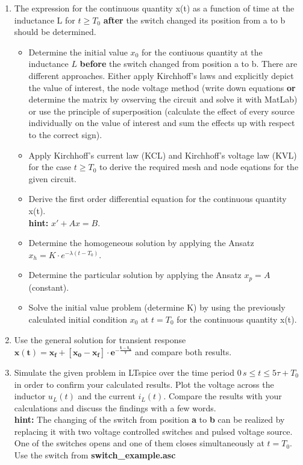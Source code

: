 \documentclass[a4paper]{article}
\begin{document}
	\begin{enumerate}
		
		\item The expression for the continuous quantity x(t) as a function of time at the
                   inductance L for $t \geq T_0$ \textbf{after} the switch changed its position from a to b should be determined. 
		
		\begin{itemize}
			\item Determine the initial value $x_0$ for the contiuous quantity at the inductance $L$ \textbf{before} the switch changed from position a to b. There are different approaches. Either apply Kirchhoff's laws and explicitly depict the value of interest, the node voltage method (write down equations \textbf{or} determine the matrix by ovserving the circuit and solve it with MatLab) or use the principle of superposition (calculate the effect of every source individually on the value of interest and sum the effects up with respect to the correct sign). 
			\item Apply Kirchhoff's current law (KCL) and Kirchhoff's voltage law (KVL)  for the case $t \geq T_0$ to derive the required mesh and node eqations for the given circuit.
			\item Derive the first order differential equation for the continuous quantity x(t). \\
				  \textbf{hint:} $x' + A x = B$.
			\item Determine the homogeneous solution by applying the Ansatz $x_h = K \cdot e^{-\lambda (t - T_0)}$.
			\item Determine the particular solution by applying the Ansatz $x_p = A$ (constant).
			\item Solve the initial value problem (determine K) by using the previously calculated initial condition $x_0$ at $t=T_0$ for the continuous quantity x(t).
		\end{itemize}
	
		\item Use the general solution for transient response $\mathbf{x(t) = x_f + [x_0 - x_f ] \cdot e^{-\frac{t-t_0}{\tau}}}$ and compare both results.
		
		\item Simulate the given problem in LTspice over the time period $0\,s \leq t \leq 5\tau + T_0$ in order to confirm your calculated results. Plot the voltage across the inductor $u_L(t)$ and the current $i_L(t)$. Compare the results with your calculations and discuss the findings with a few words.\\
		      \textbf{hint:} The changing of the switch from position \textbf{a} to \textbf{b} can be realized by replacing it with two voltage controlled switches and pulsed voltage source. One of the switches opens and one of them closes simultaneously at $t=T_0$. Use the switch from \textbf{switch\_example.asc}
		
	\end{enumerate}
\end{document}
